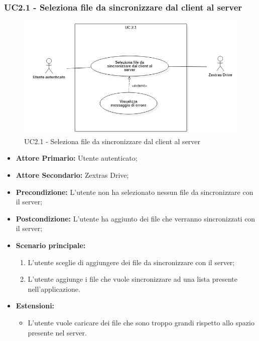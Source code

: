 \subsubsection{UC2.1 - Seleziona file da sincronizzare dal client al server}
\begin{figure}[H]
    \centering
    \includegraphics[scale = 0.7]{components/img/UC2_1.png}
    \caption{UC2.1 - Seleziona file da sincronizzare dal client al server}
\end{figure}
\begin{itemize}
\item \textbf{Attore Primario:} Utente autenticato;
\item \textbf{Attore Secondario:} Zextras Drive;
\item \textbf{Precondizione:} L'utente non ha selezionato nessun file da sincronizzare con il server;
\item \textbf{Postcondizione:} L'utente ha aggiunto dei file che verranno sincronizzati con il server;
\item \textbf{Scenario principale:}
    \begin{enumerate}
    \item L'utente sceglie di aggiungere dei file da sincronizzare con il server;
    \item L'utente aggiunge i file che vuole sincronizzare ad una lista presente nell'applicazione.
    \end{enumerate}
\item \textbf{Estensioni:}
    \begin{itemize}
    \item L'utente vuole caricare dei file che sono troppo grandi rispetto allo spazio presente nel server.
    \end{itemize}
\end{itemize}

